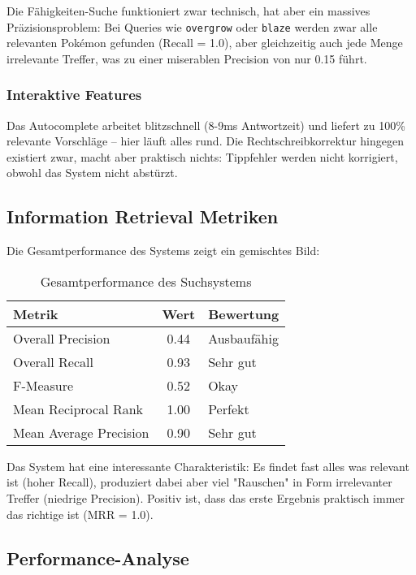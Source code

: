 Die Fähigkeiten-Suche funktioniert zwar technisch, hat aber ein massives Präzisionsproblem: Bei Queries wie \texttt{overgrow} oder \texttt{blaze} werden zwar alle relevanten Pokémon gefunden (Recall = 1.0), aber gleichzeitig auch jede Menge irrelevante Treffer, was zu einer miserablen Precision von nur 0.15 führt.

\subsubsection{Interaktive Features}

Das Autocomplete arbeitet blitzschnell (8-9ms Antwortzeit) und liefert zu 100\% relevante Vorschläge -- hier läuft alles rund. Die Rechtschreibkorrektur hingegen existiert zwar, macht aber praktisch nichts: Tippfehler werden nicht korrigiert, obwohl das System nicht abstürzt.

\subsection{Information Retrieval Metriken}

Die Gesamtperformance des Systems zeigt ein gemischtes Bild:

\begin{table}[h!]
\centering
\begin{tabular}{|l|c|l|}
\hline
\textbf{Metrik} & \textbf{Wert} & \textbf{Bewertung} \\
\hline
Overall Precision & 0.44 & Ausbaufähig \\
Overall Recall & 0.93 & Sehr gut \\
F-Measure & 0.52 & Okay \\
Mean Reciprocal Rank & 1.00 & Perfekt \\
Mean Average Precision & 0.90 & Sehr gut \\
\hline
\end{tabular}
\caption{Gesamtperformance des Suchsystems}
\end{table}

Das System hat eine interessante Charakteristik: Es findet fast alles was relevant ist (hoher Recall), produziert dabei aber viel "Rauschen" in Form irrelevanter Treffer (niedrige Precision). Positiv ist, dass das erste Ergebnis praktisch immer das richtige ist (MRR = 1.0).

\subsection{Performance-Analyse}


